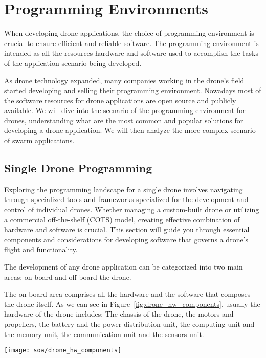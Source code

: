 \section{Programming Environments}\label{sec:soa_programming_environments}
When developing drone applications, the choice of programming environment is crucial to ensure efficient and reliable software.
The programming environment is intended as all the resources hardware and software used to accomplish the tasks of the 
application scenario being developed.

As drone technology expanded, many companies working in the drone's field started developing and selling their programming environment. 
Nowadays most of the software resources for drone applications are open source and publicly available. 
We will dive into the scenario of the programming environment for drones, understanding what are the most common and popular solutions 
for developing a drone application. We will then analyze the more complex scenario of swarm applications.

\subsection{Single Drone Programming}\label{subsec:programming_environments_single}
Exploring the programming landscape for a single drone involves navigating through specialized tools and 
frameworks specialized for the development and control of individual drones. 
Whether managing a custom-built drone or utilizing a commercial off-the-shelf (COTS) model, 
creating effective combination of hardware and software is crucial. 
This section will guide you through essential components and considerations for developing software that governs a 
drone's flight and functionality.

The development of any drone application can be categorized into two main areas: on-board and off-board the drone.

The on-board area comprises all the hardware and the software that composes the drone itself. 
As we can see in Figure~\ref{fig:drone_hw_components}, usually the hardware of the drone includes: 
The chassis of the drone, the motors and propellers, the battery and the power distribution unit, the computing unit and the memory unit,
the communication unit and the sensors unit.

\begin{SCfigure}[\sidecaptionrelwidth][h]
    \texttt{[image: soa/drone\_hw\_components]}
    \caption[Drone hardware components]{The main hardware components of a drone are: 1. Drone's chassis, 2. Motors, 3. Propellers, 4. Motor mount, 5. Battery, 6. Power distribution unit, 7. Computing and memory unit, 8. Communication unit, 9. Sensors unit }
    \label{fig:drone_hw_components}
\end{SCfigure}

